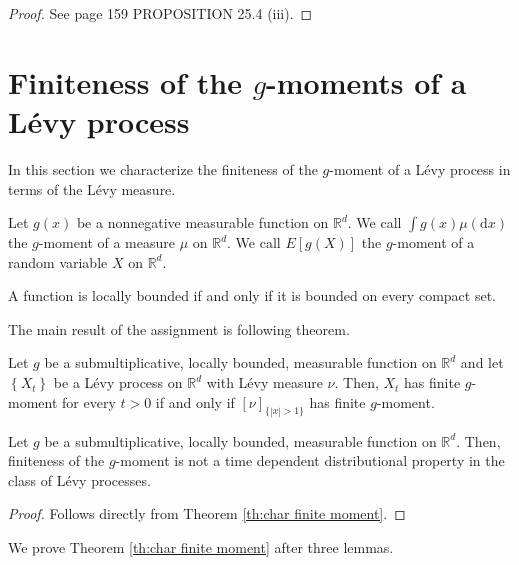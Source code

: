 \documentclass[a4paper,11pt]{article}
\begin{document}
\begin{proof}
    See \cite{sato_levy_2013} page 159 PROPOSITION 25.4 (iii).
\end{proof}

\section{Finiteness of the $g$-moments of a L\'{e}vy process}

In this section we characterize the finiteness of the $g$-moment of a Lévy process in terms of the Lévy measure.

\begin{definition}[$g$-moment]
    Let $g(x)$ be a nonnegative measurable function on $\mathbb{R}^{d}$. We call
    $\int g(x) \mu(\mathrm{d} x)$ the $g$-moment of a measure $\mu$ on $\mathbb{R}^{d}$. We call $E[g(X)]$ the $g$-moment of a random variable $X$ on $\mathbb{R}^{d}$.
\end{definition}

\begin{definition}
    A function is locally bounded if and only if it is bounded on every compact set.
\end{definition}

The main result of the assignment is following theorem.


\begin{theorem} \label{th:char finite moment}
    Let $g$ be a submultiplicative, locally bounded, measurable
    function on $\mathbb{R}^{d}$ and let $\left\{X_{t}\right\}$ be a Lévy process
    on $\mathbb{R}^{d}$ with Lévy measure $\nu$. Then, $X_{t}$ has finite $g$-moment for every $t>0$ if
    and only if $[\nu]_{\{|x|>1\}}$ has finite $g$-moment.
\end{theorem}

\begin{corollary}
    Let $g$ be a submultiplicative, locally bounded, measurable
    function on $\mathbb{R}^{d}$. Then, finiteness of the $g$-moment is not a time dependent
    distributional property in the class of Lévy processes.
\end{corollary}
\begin{proof}
    Follows directly from Theorem \ref{th:char finite moment}.
\end{proof}

We prove Theorem \ref{th:char finite moment} after three lemmas.
\end{document}
